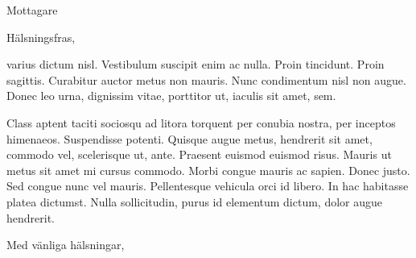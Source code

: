 \documentclass[a4paper]{letter}
\renewcommand{\ps}{P.S.~}
\begin{document}
\begin{letter}{Mottagare} 

    \opening{Hälsningsfras,}

    varius dictum nisl. Vestibulum suscipit enim ac nulla. Proin tincidunt.
    Proin sagittis. Curabitur auctor metus non mauris. Nunc condimentum nisl non
    augue.  Donec leo urna, dignissim vitae, porttitor ut, iaculis sit amet,
    sem.

    Class aptent taciti sociosqu ad litora torquent per conubia nostra, per
    inceptos himenaeos. Suspendisse potenti. Quisque augue metus, hendrerit sit
    amet, commodo vel, scelerisque ut, ante. Praesent euismod euismod risus.
    Mauris ut metus sit amet mi cursus commodo. Morbi congue mauris ac sapien.
    Donec justo. Sed congue nunc vel mauris. Pellentesque vehicula orci id
    libero. In hac habitasse platea dictumst. Nulla sollicitudin, purus id
    elementum dictum, dolor augue hendrerit.
       
    \closing{Med vänliga hälsningar,}



\end{letter}
\end{document}

